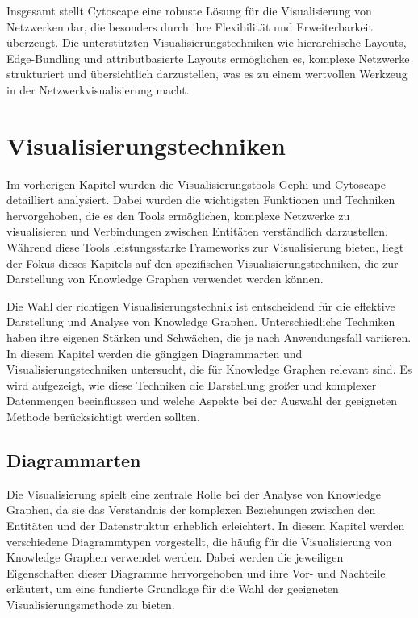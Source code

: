 Insgesamt stellt Cytoscape eine robuste Lösung für die Visualisierung von Netzwerken dar, die besonders durch ihre Flexibilität und Erweiterbarkeit überzeugt. Die unterstützten Visualisierungstechniken wie hierarchische Layouts, Edge-Bundling und attributbasierte Layouts ermöglichen es, komplexe Netzwerke strukturiert und übersichtlich darzustellen, was es zu einem wertvollen Werkzeug in der Netzwerkvisualisierung macht.

\section{Visualisierungstechniken}
\label{theory:vistechniques}

Im vorherigen Kapitel wurden die Visualisierungstools Gephi und Cytoscape detailliert analysiert. Dabei wurden die wichtigsten Funktionen und Techniken hervorgehoben, die es den Tools ermöglichen, komplexe Netzwerke zu visualisieren und Verbindungen zwischen Entitäten verständlich darzustellen. Während diese Tools leistungsstarke Frameworks zur Visualisierung bieten, liegt der Fokus dieses Kapitels auf den spezifischen Visualisierungstechniken, die zur Darstellung von Knowledge Graphen verwendet werden können.

Die Wahl der richtigen Visualisierungstechnik ist entscheidend für die effektive Darstellung und Analyse von Knowledge Graphen. Unterschiedliche Techniken haben ihre eigenen Stärken und Schwächen, die je nach Anwendungsfall variieren. In diesem Kapitel werden die gängigen Diagrammarten und Visualisierungstechniken untersucht, die für Knowledge Graphen relevant sind. Es wird aufgezeigt, wie diese Techniken die Darstellung großer und komplexer Datenmengen beeinflussen und welche Aspekte bei der Auswahl der geeigneten Methode berücksichtigt werden sollten.

\subsection{Diagrammarten}
\label{theory:visualization:types}

Die Visualisierung spielt eine zentrale Rolle bei der Analyse von Knowledge Graphen, da sie das Verständnis der komplexen Beziehungen zwischen den Entitäten und der Datenstruktur erheblich erleichtert. In diesem Kapitel werden verschiedene Diagrammtypen vorgestellt, die häufig für die Visualisierung von Knowledge Graphen verwendet werden. Dabei werden die jeweiligen Eigenschaften dieser Diagramme hervorgehoben und ihre Vor- und Nachteile erläutert, um eine fundierte Grundlage für die Wahl der geeigneten Visualisierungsmethode zu bieten.

